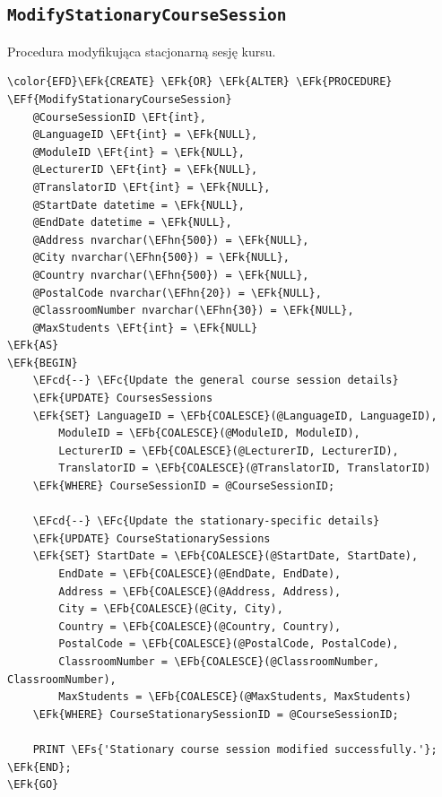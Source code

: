 \documentclass[11pt]{article}
\newcommand{\EFc}[1]{\textcolor{EFc}{\textit{#1}}} %
\newcommand{\EFcd}[1]{\textcolor{EFcd}{\textit{#1}}} %
\newcommand{\EFs}[1]{\textcolor{EFs}{#1}} %
\newcommand{\EFk}[1]{\textcolor{EFk}{\textbf{#1}}} %
\newcommand{\EFb}[1]{\textcolor{EFb}{\textbf{#1}}} %
\newcommand{\EFf}[1]{\textcolor{EFf}{#1}} %
\newcommand{\EFt}[1]{\textcolor{EFt}{\textbf{#1}}} %
\newcommand{\EFhn}[1]{\textcolor{EFhn}{#1}} %
\begin{document}
\subsection{\texttt{ModifyStationaryCourseSession}}
\label{sec:org8d8a4ca}
Procedura modyfikująca stacjonarną sesję kursu.
\begin{Code}
\begin{Verbatim}
\color{EFD}\EFk{CREATE} \EFk{OR} \EFk{ALTER} \EFk{PROCEDURE} \EFf{ModifyStationaryCourseSession}
    @CourseSessionID \EFt{int},
    @LanguageID \EFt{int} = \EFk{NULL},
    @ModuleID \EFt{int} = \EFk{NULL},
    @LecturerID \EFt{int} = \EFk{NULL},
    @TranslatorID \EFt{int} = \EFk{NULL},
    @StartDate datetime = \EFk{NULL},
    @EndDate datetime = \EFk{NULL},
    @Address nvarchar(\EFhn{500}) = \EFk{NULL},
    @City nvarchar(\EFhn{500}) = \EFk{NULL},
    @Country nvarchar(\EFhn{500}) = \EFk{NULL},
    @PostalCode nvarchar(\EFhn{20}) = \EFk{NULL},
    @ClassroomNumber nvarchar(\EFhn{30}) = \EFk{NULL},
    @MaxStudents \EFt{int} = \EFk{NULL}
\EFk{AS}
\EFk{BEGIN}
    \EFcd{--} \EFc{Update the general course session details}
    \EFk{UPDATE} CoursesSessions
    \EFk{SET} LanguageID = \EFb{COALESCE}(@LanguageID, LanguageID),
        ModuleID = \EFb{COALESCE}(@ModuleID, ModuleID),
        LecturerID = \EFb{COALESCE}(@LecturerID, LecturerID),
        TranslatorID = \EFb{COALESCE}(@TranslatorID, TranslatorID)
    \EFk{WHERE} CourseSessionID = @CourseSessionID;

    \EFcd{--} \EFc{Update the stationary-specific details}
    \EFk{UPDATE} CourseStationarySessions
    \EFk{SET} StartDate = \EFb{COALESCE}(@StartDate, StartDate),
        EndDate = \EFb{COALESCE}(@EndDate, EndDate),
        Address = \EFb{COALESCE}(@Address, Address),
        City = \EFb{COALESCE}(@City, City),
        Country = \EFb{COALESCE}(@Country, Country),
        PostalCode = \EFb{COALESCE}(@PostalCode, PostalCode),
        ClassroomNumber = \EFb{COALESCE}(@ClassroomNumber, ClassroomNumber),
        MaxStudents = \EFb{COALESCE}(@MaxStudents, MaxStudents)
    \EFk{WHERE} CourseStationarySessionID = @CourseSessionID;

    PRINT \EFs{'Stationary course session modified successfully.'};
\EFk{END};
\EFk{GO}
\end{Verbatim}
\end{Code}
\end{document}
